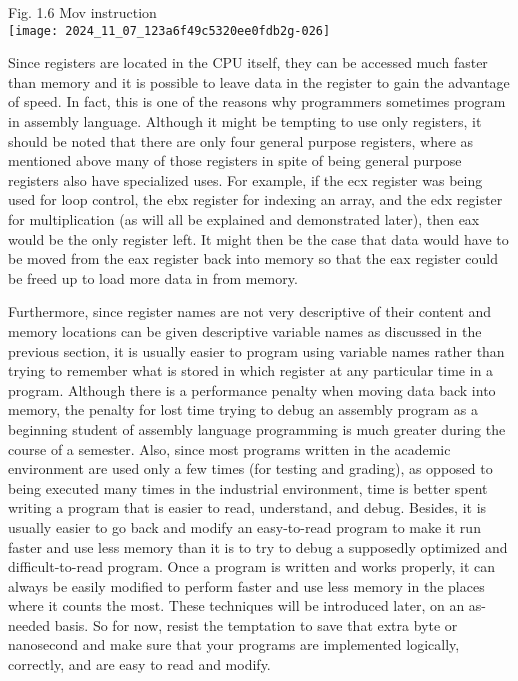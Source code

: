 \documentclass[10pt]{article}
\begin{document}
Fig. 1.6 Mov instruction\\
\texttt{[image: 2024\_11\_07\_123a6f49c5320ee0fdb2g-026]}

Since registers are located in the CPU itself, they can be accessed much faster than memory and it is possible to leave data in the register to gain the advantage of speed. In fact, this is one of the reasons why programmers sometimes program in assembly language. Although it might be tempting to use only registers, it should be noted that there are only four general purpose registers, where as mentioned above many of those registers in spite of being general purpose registers also have specialized uses. For example, if the ecx register was being used for loop control, the ebx register for indexing an array, and the edx register for multiplication (as will all be explained and demonstrated later), then eax would be the only register left. It might then be the case that data would have to be moved from the eax register back into memory so that the eax register could be freed up to load more data in from memory.

Furthermore, since register names are not very descriptive of their content and memory locations can be given descriptive variable names as discussed in the previous section, it is usually easier to program using variable names rather than trying to remember what is stored in which register at any particular time in a program. Although there is a performance penalty when moving data back into memory, the penalty for lost time trying to debug an assembly program as a beginning student of assembly language programming is much greater during the course of a semester. Also, since most programs written in the academic environment are used only a few times (for testing and grading), as opposed to being executed many times in the industrial environment, time is better spent writing a program that is easier to read, understand, and debug. Besides, it is usually easier to go back and modify an easy-to-read program to make it run faster and use less memory than it is to try to debug a supposedly optimized and difficult-to-read program. Once a program is written and works properly, it can always be easily modified to perform faster and use less memory in the places where it counts the most. These techniques will be introduced later, on an as-needed basis. So for now, resist the temptation to save that extra byte or nanosecond and make sure that your programs are implemented logically, correctly, and are easy to read and modify.
\end{document}
